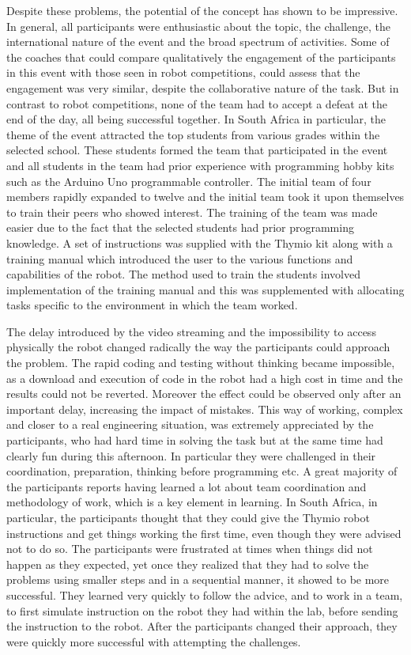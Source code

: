 \documentclass{intech-journal}
\begin{document}
Despite these problems, the potential of the concept has shown to be impressive.
In general, all participants were enthusiastic about the topic, the challenge, the international nature of the event and the broad spectrum of activities. 
Some of the coaches that could compare qualitatively the engagement of the participants in this event with those seen in robot competitions, could assess that the engagement was very similar, despite the collaborative nature of the task. 
But in contrast to robot competitions, none of the team had to accept a defeat at the end of the day, all being successful together. 
In South Africa in particular, the theme of the event attracted the top students from various grades within the selected school. 
These students formed the team that participated in the event and all students in the team had prior experience with programming hobby kits such as the Arduino Uno programmable controller. 
The initial team of four members rapidly expanded to twelve and the initial team took it upon themselves to train their peers who showed interest. 
The training of the team was made easier due to the fact that the selected students had prior programming knowledge. 
A set of instructions was supplied with the Thymio kit along with a training manual which introduced the user to the various functions and capabilities of the robot. 
The method used to train the students involved implementation of the training manual and this was supplemented with allocating tasks specific to the environment in which the team worked. 

The delay introduced by the video streaming and the impossibility to access physically the robot changed radically the way the participants could approach the problem.
The rapid coding and testing without thinking became impossible, as a download and execution of code in the robot had a high cost in time and the results could not be reverted. 
Moreover the effect could be observed only after an important delay, increasing the impact of mistakes.
This way of working, complex and closer to a real engineering situation, was extremely appreciated by the participants, who had hard time in solving the task but at the same time had clearly fun during this afternoon.
In particular they were challenged in their coordination, preparation, thinking before programming etc. 
A great majority of the participants reports having learned a lot about team coordination and methodology of work, which is a key element in learning.
In South Africa, in particular, the participants thought that they could give the Thymio robot instructions and get things working the first time, even though they were advised not to do so. 
The participants were frustrated at times when things did not happen as they expected, yet once they realized that they had to solve the problems using smaller steps and in a sequential manner, it showed to be more successful. 
They learned very quickly to follow the advice, and to work in a team, to first simulate instruction on the robot they had within the lab, before sending the instruction to the robot.
After the participants changed their approach, they were quickly more successful with attempting the challenges. 
\end{document}
